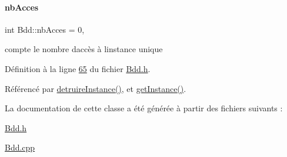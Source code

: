 \paragraph{\texorpdfstring{nb\+Acces}{nbAcces}}
{\footnotesize\ttfamily int Bdd\+::nb\+Acces = 0\hspace{0.3cm}{\ttfamily [static]}, {\ttfamily [private]}}



compte le nombre d\textquotesingle{}accès à l\textquotesingle{}instance unique 



Définition à la ligne \hyperlink{_bdd_8h_source_l00065}{65} du fichier \hyperlink{_bdd_8h_source}{Bdd.\+h}.



Référencé par \hyperlink{_bdd_8cpp_source_l00073}{detruire\+Instance()}, et \hyperlink{_bdd_8cpp_source_l00053}{get\+Instance()}.



La documentation de cette classe a été générée à partir des fichiers suivants \+:\begin{DoxyCompactItemize}
\item 
\hyperlink{_bdd_8h}{Bdd.\+h}\item 
\hyperlink{_bdd_8cpp}{Bdd.\+cpp}\end{DoxyCompactItemize}
